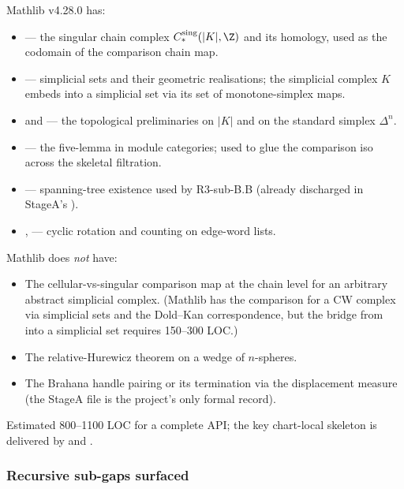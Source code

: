 Mathlib v4.28.0 has:
\begin{itemize}
\item {} ---
  the singular chain complex \(C^{\mathrm{sing}}_{*}(|K|,\Z)\) and
  its homology, used as the codomain of the comparison chain map.
\item {} ---
  simplicial sets and their geometric realisations; the simplicial
  complex \(K\) embeds into a simplicial set via its set of
  monotone-simplex maps.
\item {} and
   --- the topological
  preliminaries on \(|K|\) and on the standard simplex \(\Delta^{n}\).
\item {} ---
  the five-lemma in module categories; used to glue the comparison
  iso across the skeletal filtration.
\item {} ---
  spanning-tree existence used by R3-sub-B.B (already discharged
  in StageA's ).
\item {},  ---
  cyclic rotation and counting on edge-word lists.
\end{itemize}

Mathlib does \emph{not} have:
\begin{itemize}
\item The cellular-vs-singular comparison map at the chain level
  for an arbitrary abstract simplicial complex.  (Mathlib has the
  comparison for a CW complex via simplicial sets and the
  Dold--Kan correspondence, but the bridge from
   into a simplicial set requires
  150--300 LOC.)
\item The relative-Hurewicz theorem on a wedge of \(n\)-spheres.
\item The Brahana handle pairing or its termination via the
  displacement measure (the StageA file is the project's only
  formal record).
\end{itemize}

Estimated 800--1100 LOC for a complete API; the key chart-local
skeleton is delivered by 
and .

\subsubsection*{Recursive sub-gaps surfaced}

